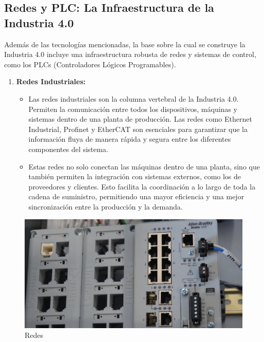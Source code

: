 \documentclass[
  10pt,
  letterpaper,
]{book}
\providecommand{\tightlist}{%
  \setlength{\itemsep}{0pt}\setlength{\parskip}{0pt}}\usepackage{longtable,booktabs,array}
\begin{document}
\subsection{Redes y PLC: La Infraestructura de la Industria
4.0}\label{redes-y-plc-la-infraestructura-de-la-industria-4.0}

Además de las tecnologías mencionadas, la base sobre la cual se
construye la Industria 4.0 incluye una infraestructura robusta de redes
y sistemas de control, como los PLCs (Controladores Lógicos
Programables).

\begin{enumerate}
\def\labelenumi{\arabic{enumi}.}
\tightlist
\item
  \textbf{Redes Industriales:}

  \begin{itemize}
  \tightlist
  \item
    Las redes industriales son la columna vertebral de la Industria 4.0.
    Permiten la comunicación entre todos los dispositivos, máquinas y
    sistemas dentro de una planta de producción. Las redes como Ethernet
    Industrial, Profinet y EtherCAT son esenciales para garantizar que
    la información fluya de manera rápida y segura entre los diferentes
    componentes del sistema.
  \item
    Estas redes no solo conectan las máquinas dentro de una planta, sino
    que también permiten la integración con sistemas externos, como los
    de proveedores y clientes. Esto facilita la coordinación a lo largo
    de toda la cadena de suministro, permitiendo una mayor eficiencia y
    una mejor sincronización entre la producción y la demanda.
  \end{itemize}
\end{enumerate}

\begin{figure}[H]

{\centering \includegraphics{Img/ethernet.png}

}

\caption{Redes}

\end{figure}%
\end{document}
